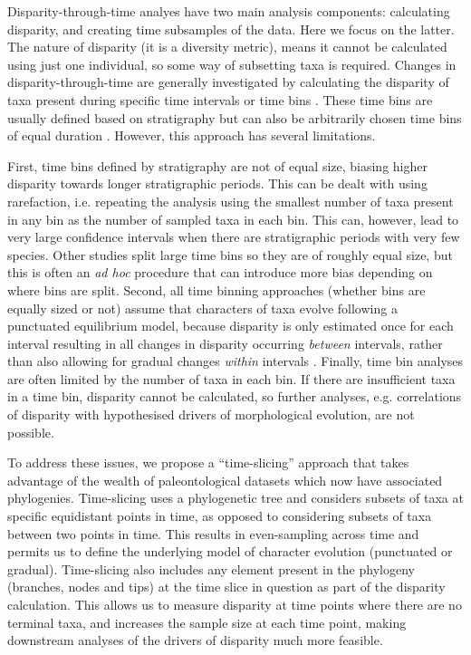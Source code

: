 \documentclass[12pt,a4paper]{article}
\begin{document}
Disparity-through-time analyes have two main analysis components: calculating disparity, and creating time subsamples of the data. 
Here we focus on the latter.
The nature of disparity (it is a diversity metric), means it cannot be calculated using just one individual, so some way of subsetting taxa is required.
Changes in disparity-through-time are generally investigated by calculating the disparity of taxa present during specific time intervals or time bins \citep[e.g][]{cisneros2010,prentice2011,Hughes20082013,hopkinsdecoupling2013,bentonmodels2014,bensonfaunal2014}.
These time bins are usually defined based on stratigraphy \citep[e.g.][]{cisneros2010,prentice2011,Hughes20082013,bentonmodels2014} but can also be arbitrarily chosen time bins of equal duration \citep{Butler2012,hopkinsdecoupling2013,bensonfaunal2014}.
However, this approach has several limitations.

First, time bins defined by stratigraphy are not of equal size, biasing higher disparity towards longer stratigraphic periods. 
This can be dealt with using rarefaction, i.e. repeating the analysis using the smallest number of taxa present in any bin as the number of sampled taxa in each bin. 
This can, however, lead to very large confidence intervals when there are stratigraphic periods with very few species.
Other studies split large time bins so they are of roughly equal size, but this is often an \textit{ad hoc} procedure that can introduce more bias depending on where bins are split.
Second, all time binning approaches (whether bins are equally sized or not) assume that characters of taxa evolve following a punctuated equilibrium model, because disparity is only estimated once for each interval resulting in all changes in disparity occurring \textit{between} intervals, rather than also allowing for gradual changes \textit{within} intervals \citep{Hunt21042015}.
Finally, time bin analyses are often limited by the number of taxa in each bin.
If there are insufficient taxa in a time bin, disparity cannot be calculated, so further analyses, e.g. correlations of disparity with hypothesised drivers of morphological evolution, are not possible.

To address these issues, we propose a ``time-slicing'' approach that takes advantage of the wealth of paleontological datasets which now have associated phylogenies. 
Time-slicing uses a phylogenetic tree and considers subsets of taxa at specific equidistant points in time, as opposed to considering subsets of taxa between two points in time.
This results in even-sampling across time and permits us to define the underlying model of character evolution (punctuated or gradual).  
Time-slicing also includes any element present in the phylogeny (branches, nodes and tips) at the time slice in question as part of the disparity calculation.
This allows us to measure disparity at time points where there are no terminal taxa, and increases the sample size at each time point, making downstream analyses of the drivers of disparity much more feasible.
\end{document}
